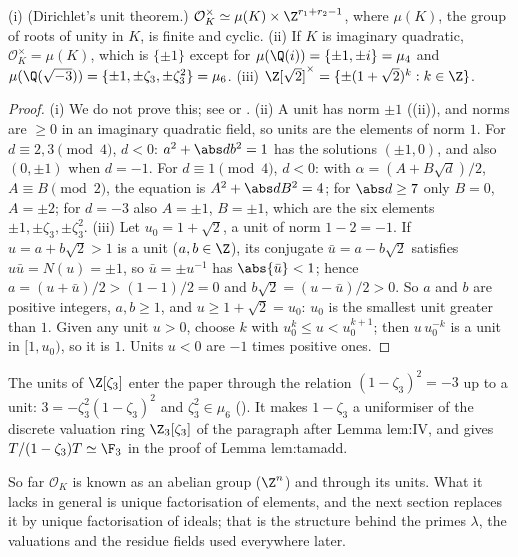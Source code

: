 \begin{theorem}[units]\label{thm:ant:units}
(i) (Dirichlet's unit theorem.) $\mathcal O_K^\times\simeq\mu(K)\times\Z^{r_1+r_2-1}$, where $\mu(K)$, the group of roots of unity in $K$, is finite
and cyclic. (ii) If $K$ is imaginary quadratic, $\mathcal O_K^\times=\mu(K)$, which is $\{\pm1\}$ except for $\mu(\Q(i))=\{\pm1,\pm i\}=\mu_4$ and
$\mu(\Q(\sqrt{-3}))=\{\pm1,\pm\zeta_3,\pm\zeta_3^2\}=\mu_6$. (iii) $\Z[\sqrt2]^\times=\{\pm(1+\sqrt2)^k:k\in\Z\}$.
\end{theorem}

\begin{proof}
(i) We do not prove this; see \cite[Chapter I, Section 7]{Neukirch} or \cite[Chapter 5]{Marcus77}. (ii) A unit has norm $\pm1$
((ii)), and norms are $\ge0$ in an imaginary quadratic field, so units are the elements of norm $1$. For $d\equiv2,3\pmod4$,
$d<0$: $a^2+\abs db^2=1$ has the solutions $(\pm1,0)$, and also $(0,\pm1)$ when $d=-1$. For $d\equiv1\pmod4$, $d<0$: with $\alpha=(A+B\sqrt d)/2$, $A\equiv B
\pmod2$, the equation is $A^2+\abs dB^2=4$; for $\abs d\ge7$ only $B=0$, $A=\pm2$; for $d=-3$ also $A=\pm1$, $B=\pm1$, which are the six elements
$\pm1,\pm\zeta_3,\pm\zeta_3^2$. (iii) Let $u_0=1+\sqrt2$, a unit of norm $1-2=-1$. If $u=a+b\sqrt2>1$ is a unit ($a,b\in\Z$), its conjugate
$\bar u=a-b\sqrt2$ satisfies $u\bar u=N(u)=\pm1$, so $\bar u=\pm u^{-1}$ has $\abs{\bar u}<1$; hence $a=(u+\bar u)/2>(1-1)/2=0$ and $b\sqrt2=(u-\bar u)/2>0$.
So $a$ and $b$ are positive integers, $a,b\ge1$, and $u\ge1+\sqrt2=u_0$: $u_0$ is the smallest unit greater than $1$. Given any unit $u>0$, choose $k$ with
$u_0^k\le u<u_0^{k+1}$; then $u\,u_0^{-k}$ is a unit in $[1,u_0)$, so it is $1$. Units $u<0$ are $-1$ times positive ones.
\end{proof}

The units of $\Z[\zeta_3]$ enter the paper through the relation $(1-\zeta_3)^2=-3$ up to a unit:
$3=-\zeta_3^2(1-\zeta_3)^2$ and $\zeta_3^2\in\mu_6$ (). It makes $1-\zeta_3$ a uniformiser of the discrete valuation ring $\Z_3[\zeta_3]$ of the
paragraph after Lemma lem:IV, and gives $T/(1-\zeta_3)T\simeq\F_3$ in the proof of Lemma lem:tamadd.

So far $\mathcal O_K$ is known as an abelian group ($\Z^n$) and through its units. What it lacks in general is unique factorisation of elements, and
the next section replaces it by unique factorisation of ideals; that is the structure behind the primes $\lambda$, the valuations and the residue fields used
everywhere later.

